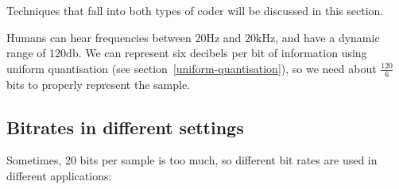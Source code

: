 Techniques that fall into both types of coder will be discussed in this section.


Humans can hear frequencies between $20\si{\hertz}$ and $20\si{\kilo\hertz}$,
and have a dynamic range of $120\si{\decibel}$. We can represent six decibels
per bit of information using uniform quantisation (see section~\ref{uniform-quantisation}),
so we need about $\frac{120}{6}$ bits to properly represent the sample.

\subsection{Bitrates in different settings}

Sometimes, 20 bits per sample is too much, so different bit rates are used in
different applications:

